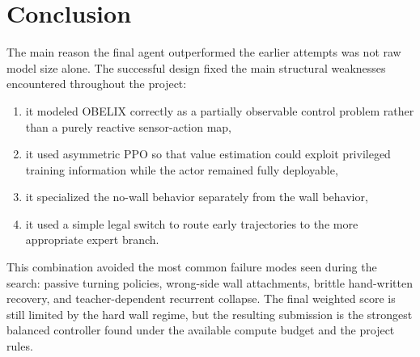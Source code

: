 \documentclass[11pt, oneside]{article}   	%
\begin{document}
\section{Conclusion}

The main reason the final agent outperformed the earlier attempts was not raw model
size alone. The successful design fixed the main structural weaknesses encountered
throughout the project:
\begin{enumerate}[leftmargin=1.5em]
  \item it modeled OBELIX correctly as a partially observable control problem rather
  than a purely reactive sensor-action map,
  \item it used asymmetric PPO so that value estimation could exploit privileged training
  information while the actor remained fully deployable,
  \item it specialized the no-wall behavior separately from the wall behavior,
  \item it used a simple legal switch to route early trajectories to the more appropriate
  expert branch.
\end{enumerate}

This combination avoided the most common failure modes seen during the search:
passive turning policies, wrong-side wall attachments, brittle hand-written recovery, and
teacher-dependent recurrent collapse. The final weighted score is still limited by the
hard wall regime, but the resulting submission is the strongest balanced controller found
under the available compute budget and the project rules.
\end{document}
